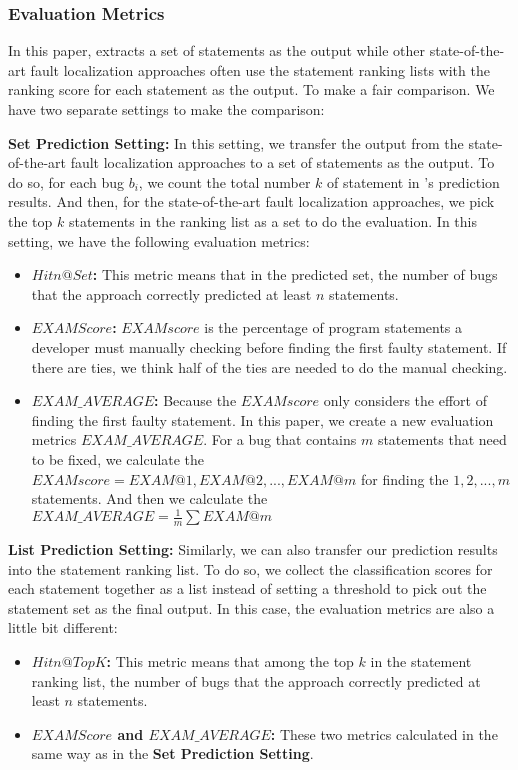 \subsubsection{Evaluation Metrics}

In this paper, \tool extracts a set of statements as the output while other state-of-the-art fault localization approaches often use the statement ranking lists with the ranking score for each statement as the output. To make a fair comparison. We have two separate settings to make the comparison:

{\bf Set Prediction Setting:} In this setting, we transfer the output from the state-of-the-art fault localization approaches to a set of statements as the output. To do so, for each bug $b_i$, we count the total number $k$ of statement in \tool's prediction results. And then, for the state-of-the-art fault localization approaches, we pick the top $k$ statements in the ranking list as a set to do the evaluation. In this setting, we have the following evaluation metrics:

\begin{itemize}
	\item {\bf $Hit n @Set$:} This metric means that in the predicted set, the number of bugs that the approach correctly predicted at least $n$ statements.
	\item {\bf $EXAM Score$\cite{wong2008crosstab}:} $EXAM score$ is the percentage of program statements a developer must manually checking before finding the first faulty statement. If there are ties, we think half of the ties are needed to do the manual checking.
	\item{\bf $EXAM\_AVERAGE$:} Because the $EXAM score$ only considers the effort of finding the first faulty statement. In this paper, we create a new evaluation metrics $EXAM\_AVERAGE$. For a bug that contains $m$ statements that need to be fixed, we calculate the $EXAM score = {EXAM@1, EXAM@2, ..., EXAM@m}$ for finding the $1, 2, ..., m$ statements. And then we calculate the $EXAM\_AVERAGE = \frac{1}{m}\sum EXAM@m$
\end{itemize}

{\bf List Prediction Setting:} Similarly, we can also transfer our prediction results into the statement ranking list. To do so, we collect the classification scores for each statement together as a list instead of setting a threshold to pick out the statement set as the final output. In this case, the evaluation metrics are also a little bit different:

\begin{itemize}
	\item {\bf $Hit n @ Top K$:} This metric means that among the top $k$ in the statement ranking list, the number of bugs that the approach correctly predicted at least $n$ statements.
	\item {\bf $EXAM Score$\cite{wong2008crosstab} and $EXAM\_AVERAGE$:} These two metrics calculated in the same way as in the {\bf Set Prediction Setting}.
\end{itemize}
